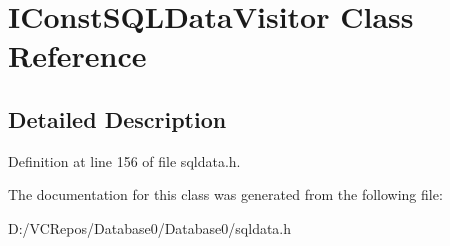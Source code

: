 \hypertarget{class_i_const_s_q_l_data_visitor}{}\section{I\+Const\+S\+Q\+L\+Data\+Visitor Class Reference}
\label{class_i_const_s_q_l_data_visitor}


\subsection{Detailed Description}


Definition at line 156 of file sqldata.\+h.



The documentation for this class was generated from the following file\+:\begin{DoxyCompactItemize}
\item 
D\+:/\+V\+C\+Repos/\+Database0/\+Database0/sqldata.\+h\end{DoxyCompactItemize}
